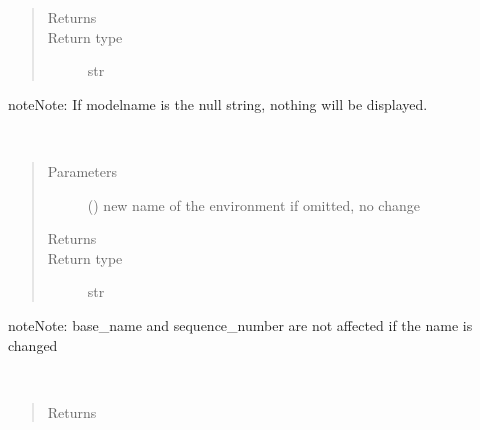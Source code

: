 \documentclass[letterpaper,10pt,english]{sphinxmanual}
\begin{document}
\begin{fulllineitems}
\begin{fulllineitems}
\begin{quote}
\begin{description}
\item[{Returns}] \leavevmode
{}

\item[{Return type}] \leavevmode
str

\end{description}\end{quote}

\begin{sphinxadmonition}{note}{Note:}
If modelname is the null string, nothing will be displayed.
\end{sphinxadmonition}

\end{fulllineitems}


\begin{fulllineitems}
\label{\detokenize{Reference:salabim.Environment.name}}~\begin{quote}\begin{description}
\item[{Parameters}] \leavevmode
{} () \textendash{} new name of the environment
if omitted, no change

\item[{Returns}] \leavevmode
{}

\item[{Return type}] \leavevmode
str

\end{description}\end{quote}

\begin{sphinxadmonition}{note}{Note:}
base\_name and sequence\_number are not affected if the name is changed
\end{sphinxadmonition}

\end{fulllineitems}


\begin{fulllineitems}
\label{\detokenize{Reference:salabim.Environment.now}}~\begin{quote}\begin{description}
\item[{Returns}] \leavevmode
{}


\end{description}
\end{quote}
\end{fulllineitems}
\end{fulllineitems}
\end{document}
